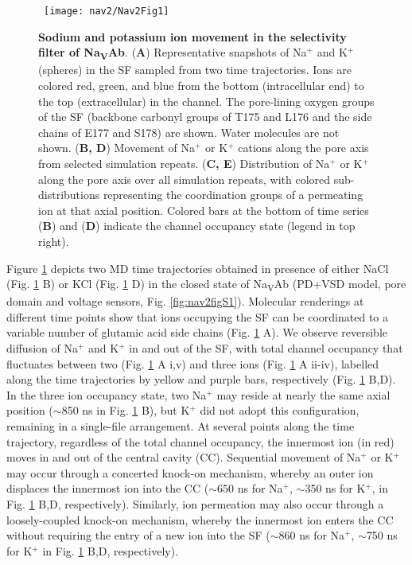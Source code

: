 \begin{refsection}
\begin{figure}[!ptb]
\centering\
\texttt{[image: nav2/Nav2Fig1]}
\caption[Sodium and potassium ion movement in the selectivity filter of Na\textsubscript{V}Ab]{\textbf{Sodium and potassium ion movement in the selectivity filter of Na\textsubscript{V}Ab}. (\textbf{A}) Representative snapshots of Na$^+$ and K$^+$ (spheres) in the SF sampled from two time trajectories.  Ions are colored red, green, and blue from the bottom (intracellular end) to the top (extracellular) in the channel.  The pore-lining oxygen groups of the SF (backbone carbonyl groups of T175 and L176 and the side chains of E177 and S178) are shown. Water molecules are not shown.  (\textbf{B, D}) Movement of Na$^+$ or K$^+$ cations along the pore axis from selected simulation repeats. (\textbf{C, E}) Distribution of Na$^+$ or K$^+$ along the pore axis over all simulation repeats, with colored sub-distributions representing the coordination groups of a permeating ion at that axial position. Colored bars at the bottom of time series (\textbf{B}) and (\textbf{D}) indicate the channel occupancy state (legend in top right).}
\label{fig:nav2fig1}
\end{figure}

Figure \ref{fig:nav2fig1} depicts two MD time trajectories obtained in presence of either NaCl (Fig. \ref{fig:nav2fig1} B) or KCl (Fig. \ref{fig:nav2fig1} D) in the closed state of Na\textsubscript{V}Ab (PD+VSD model, pore domain and voltage sensors, Fig. \ref{fig:nav2figS1}). Molecular renderings at different time points show that ions occupying the SF can be coordinated to a variable number of glutamic acid side chains (Fig. \ref{fig:nav2fig1} A). We observe reversible diffusion of Na$^+$ and K$^+$ in and out of the SF, with total channel occupancy that fluctuates between two (Fig. \ref{fig:nav2fig1} A i,v) and three ions (Fig. \ref{fig:nav2fig1} A ii-iv), labelled along the time trajectories by yellow and purple bars, respectively (Fig. \ref{fig:nav2fig1} B,D). In the three ion occupancy state, two Na$^+$ may reside at nearly the same axial position ($\sim$850 ns in Fig. \ref{fig:nav2fig1} B), but K$^+$ did not adopt this configuration, remaining in a single-file arrangement. At several points along the time trajectory, regardless of the total channel occupancy, the innermost ion (in red) moves in and out of the central cavity (CC). Sequential movement of Na$^+$ or K$^+$ may occur through a concerted knock-on mechanism, whereby an outer ion displaces the innermost ion into the CC ($\sim$650 ns for Na$^+$, $\sim$350 ns for K$^+$, in Fig. \ref{fig:nav2fig1} B,D, respectively). Similarly, ion permeation may also occur through a loosely-coupled knock-on mechanism, whereby the innermost ion enters the CC without requiring the entry of a new ion into the SF ($\sim$860 ns for Na$^+$, $\sim$750 ns for K$^+$ in Fig. \ref{fig:nav2fig1} B,D, respectively). 


\end{refsection}
